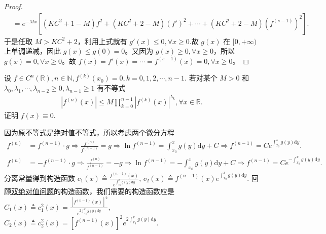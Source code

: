 \documentclass[../../main.tex]{subfiles}%
\begin{document}
\begin{proof}
\begin{align*}
&=e^{-Mx}\left[ \left( KC^2+1-M \right) f^2+\left( KC^2+2-M \right) \left( f' \right) ^2+\cdots +\left( KC^2+2-M \right) \left( f^{\left( s-1 \right)} \right) ^2 \right] .
\end{align*}
于是任取 $M>KC^2+2$，利用上式就有 $g'\left( x \right) \leqslant 0,\forall x\geqslant  0$.故 $g\left( x \right)$ 在 $[0,+\infty )$ 上单调递减，因此 $g\left( x \right) \leqslant g\left( 0 \right) =0$。又因为 $g\left( x \right) \geqslant 0,\forall x\geqslant 0$，所以 $g\left( x \right) =0,\forall x\geqslant 0$。故
$f\left( x \right) =f'\left( x \right) =\cdots =f^{\left( s-1 \right)}\left( x \right) =0,\forall x\geqslant 0$。
\end{proof}

\begin{example}
设 $f \in C^n(\mathbb{R}), n \in \mathbb{N}, f^{(k)}(x_0) = 0, k = 0, 1, 2, \cdots, n - 1$. 若对某个 $M > 0$ 和 $\lambda_0, \lambda_1, \cdots, \lambda_{n - 2} \geqslant  0, \lambda_{n - 1} \geqslant  1$ 有不等式
\begin{align*}
|f^{(n)}(x)| \leqslant  M \prod_{k = 0}^{n - 1} |f^{(k)}(x)|^{\lambda_k}, \forall x \in \mathbb{R}.
\end{align*}
证明 $f(x) \equiv 0$.
\end{example}
\begin{note}
因为原不等式是绝对值不等式，所以考虑两个微分方程
\begin{align*}
f^{(n)} &= f^{(n-1)} \cdot g \Rightarrow \frac{f^{(n)}}{f^{(n-1)}} = g \Rightarrow \ln f^{(n-1)} = \int_{x_0}^x g(y) \mathrm{d}y + C \Rightarrow f^{(n-1)} = C e^{\int_{x_0}^x g(y) \mathrm{d}y}.
\end{align*}
\begin{align*}
f^{(n)} &= -f^{(n-1)} \cdot g \Rightarrow \frac{f^{(n)}}{f^{(n-1)}} = -g \Rightarrow \ln f^{(n-1)} = -\int_{x_0}^x g(y) \mathrm{d}y + C \Rightarrow f^{(n-1)} = C e^{-\int_{x_0}^x g(y) \mathrm{d}y}.
\end{align*}
分离常量得到构造函数 $c_1(x) \triangleq \frac{f^{(n-1)}(x)}{e^{\int_{x_0}^x g(y) \mathrm{d}y}}$, $c_2(x) \triangleq f^{(n-1)}(x) e^{\int_{x_0}^x g(y) \mathrm{d}y}$.
回顾\hyperref[subsection:双绝对值问题]{双绝对值问题}的构造函数，我们需要的构造函数应是 $C_1(x) \triangleq c_1^2(x) = \frac{[f^{(n-1)}(x)]^2}{e^{2\int_{x_0}^x g(y) \mathrm{d}y}}$, $C_2(x) \triangleq c_2^2(x) = [f^{(n-1)}(x)]^2 e^{2\int_{x_0}^x g(y) \mathrm{d}y}$.
\end{note}
\end{document}
